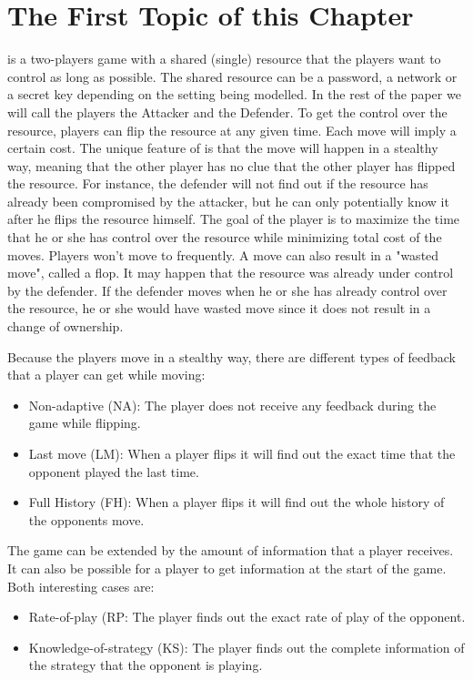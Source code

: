 \section{The First Topic of this Chapter}
 is a two-players game with a shared (single) resource that the players want to control as long as possible. The shared resource can be a password, a network or a secret key depending on the setting being modelled. In the rest of the paper we will call the players the Attacker and the Defender. To get the control over the resource, players can flip the resource at any given time. Each move will imply a certain cost. The unique feature of  is that the move will happen in a stealthy way, meaning that the other player has no clue that the other player has flipped the resource. For instance, the defender will not find out if the resource has already been compromised by the attacker, but he can only potentially know it after he flips the resource himself. The goal of the player is to maximize the time that he or she has control over the resource while minimizing total cost of the moves. Players won't move to frequently. A move can also result in a "wasted move", called a flop. It may happen that the resource was already under control by the defender. If the defender moves when he or she has already control over the resource, he or she would have wasted move since it does not result in a change of ownership. 
 
Because the players move in a stealthy way, there are different types of feedback that a player can get while moving:
\begin{itemize}
\item Non-adaptive (NA): The player does not receive any feedback during the game while flipping.
\item Last move (LM): When a player flips it will find out the exact time that the opponent played the last time.
\item Full History (FH): When a player flips it will find out the whole history of the opponents move.
\end{itemize}
The game can be extended by the amount of information that a player receives. It can also be possible for a player to get information at the start of the game. Both interesting cases are:
\begin{itemize}
\item Rate-of-play (RP: The player finds out the exact rate of play of the opponent.
\item Knowledge-of-strategy (KS): The player finds out the complete information of the strategy that the opponent is playing.
\end{itemize}

